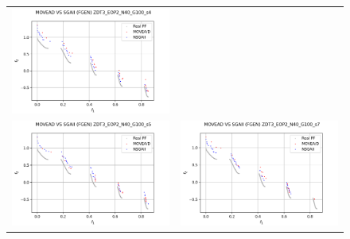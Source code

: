 \begin{figure}[H]
\begin{tabular}{c c}
    \includegraphics[scale=0.5]{figures/ZDT3_EOP2_N40_G100_T6/s4_comp.png}\\
    \includegraphics[scale=0.5]{figures/ZDT3_EOP2_N40_G100_T6/s5_comp.png} &
    \includegraphics[scale=0.5]{figures/ZDT3_EOP2_N40_G100_T6/s7_comp.png}\\

\end{tabular}
\end{figure}
